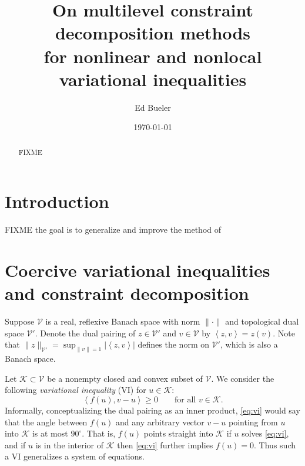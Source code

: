 \documentclass[letterpaper,final,12pt,reqno]{amsart}
\theoremstyle{cstyle}
\theoremstyle{dstyle}
\numberwithin{equation}{section}
\numberwithin{figure}{section}
\numberwithin{table}{section}
\numberwithin{theorem}{section}
\newcommand{\cK}{\mathcal{K}}
\newcommand{\cV}{\mathcal{V}}
\newcommand{\ip}[2]{\left<#1,#2\right>}
\begin{document}
\title[On MCD methods for nonlinear and nonlocal VIs]{On multilevel constraint decomposition methods \\ for nonlinear and nonlocal variational inequalities}

\author{Ed Bueler}

\date{\today}

\begin{abstract} FIXME
\end{abstract}

\maketitle


\thispagestyle{empty}

\section{Introduction} \label{sec:intro}

FIXME the goal is to generalize and improve the method of \cite{Tai2003}

\section{Coercive variational inequalities and constraint decomposition} \label{sec:vi}

Suppose $\cV$ is a real, reflexive Banach space with norm $\|\cdot\|$ and topological dual space $\cV'$.  Denote the dual pairing of $z \in \cV'$ and $v\in \cV$ by $\ip{z}{v} = z(v)$.  Note that $\|z\|_{\cV'} = \sup_{\|v\|=1} |\ip{z}{v}|$ defines the norm on $\cV'$, which is also a Banach space.

Let $\cK \subset \cV$ be a nonempty closed and convex subset of $\cV$.  We consider the following \emph{variational inequality} (VI) for $u\in \cK$:
\begin{equation}
\ip{f(u)}{v-u} \ge 0 \qquad \text{for all } v\in \cK. \label{eq:vi}
\end{equation}
Informally, conceptualizing the dual pairing as an inner product, \eqref{eq:vi} would say that the angle between $f(u)$ and any arbitrary vector $v-u$ pointing from $u$ into $\cK$ is at most $90^\circ$.  That is, $f(u)$ points straight into $\cK$ if $u$ solves \eqref{eq:vi}, and if $u$ is in the interior of $\cK$ then \eqref{eq:vi} further implies $f(u)=0$.  Thus such a VI generalizes a system of equations.
\end{document}
